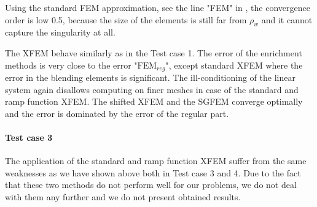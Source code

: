 Using the standard FEM approximation, see the line "FEM" in , the convergence order is low 0.5,
because the size of the elements is still far from $\rho_w$ and it cannot capture the singularity at all.

The XFEM behave similarly as in the Test case 1. The error of the enrichment methods is very close to the error "$\textrm{FEM}_{reg}$",
except standard XFEM where the error in the blending elements is significant. The ill-conditioning of the linear system again 
disallows computing on finer meshes in case of the standard and ramp function XFEM.
The shifted XFEM and the SGFEM converge optimally and the error is dominated by the error of the regular part.


\paragraph{Test case 3}
The application of the standard and ramp function XFEM suffer from the same weaknesses as we have shown above both in Test case 3 and 4.
Due to the fact that these two methods do not perform well for our problems, we do not deal with them any further
and we do not present obtained results.

